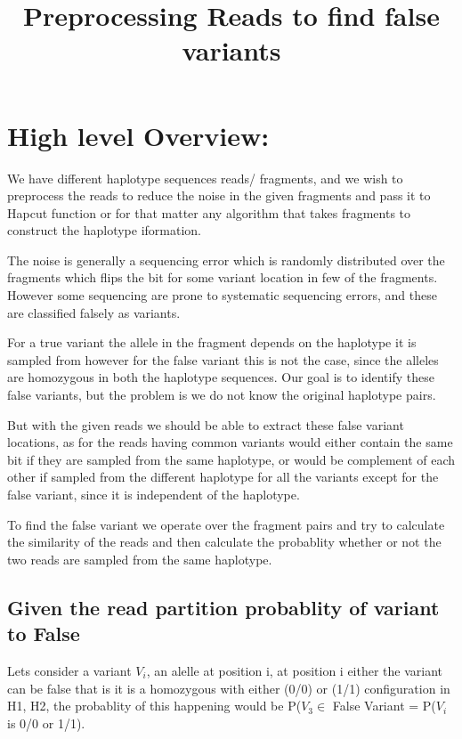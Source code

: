 \documentclass[9pt]{osa-supplemental-document}
\title{Preprocessing Reads to find false variants}
\author{} %
\begin{document}
\maketitle


\section{High level Overview:}

We have different haplotype sequences reads/ fragments, and we wish to preprocess the reads to reduce the noise in the given fragments and pass it to Hapcut function or for that matter any algorithm that takes fragments to construct the haplotype iformation. 

The noise is generally a sequencing error which is randomly distributed over the fragments which flips the bit for some variant location in few of the fragments. However some sequencing are prone to systematic sequencing errors, and these are classified falsely as variants. 

For a true variant the allele in the fragment depends on the haplotype it is sampled from however for the false variant this is not the case, since the alleles are homozygous in both the haplotype sequences.
Our goal is to identify these false variants, but the problem is we do not know the original haplotype pairs. 


But with the given reads we should be able to extract these false variant locations, as for the reads having common variants would either contain the same bit if they are sampled from the same haplotype, or would be complement of each other if sampled from the different haplotype for all the variants except for the false variant, since it is independent of the haplotype.

To find the false variant we operate over the fragment pairs and try to calculate the similarity of the reads and then calculate the probablity whether or not the two reads are sampled from the same haplotype. 

\subsection{Given the read partition probablity of variant to False}

Lets consider a variant $V_i$, an alelle at position i, at position i either the variant can be false that is it is a homozygous with either (0/0) or (1/1) configuration in H1, H2, the probablity of this happening would be P($V_3 \in $ False Variant = P($V_i$ is 0/0 or 1/1).
\end{document}
